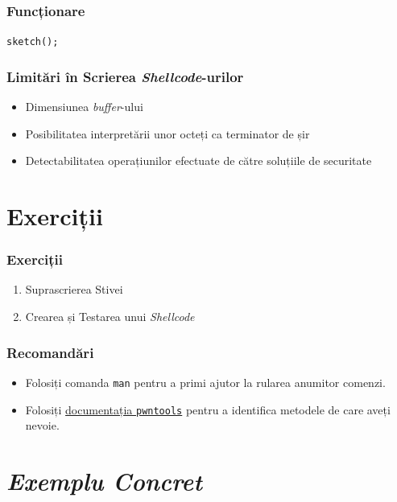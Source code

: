 \documentclass[xcolor={table}]{beamer}
\begin{document}
	\begin{frame}
		\frametitle{Funcționare}\pause
		\centering
        \texttt{sketch();}
	\end{frame}
	
	\begin{frame}
		\frametitle{Limitări în Scrierea \textit{Shellcode}-urilor}\pause
		\begin{itemize}[<+->]
			\item Dimensiunea \textit{buffer}-ului
			\item Posibilitatea interpretării unor octeți ca terminator de șir
			\item Detectabilitatea operațiunilor efectuate de către soluțiile de securitate
		\end{itemize}
	\end{frame}
	
	\section{Exerciții}
	
	\begin{frame}
		\frametitle{Exerciții}\pause
		\begin{enumerate}[<+->]
		    \item Suprascrierea Stivei
		    \item Crearea și Testarea unui \textit{Shellcode}
	    \end{enumerate}
	\end{frame}

	\begin{frame}
		\frametitle{Recomandări}\pause
		\begin{itemize}[<+->]
		    \item Folosiți comanda \texttt{man} pentru a primi ajutor la rularea anumitor comenzi.
		    \item Folosiți \href{https://docs.pwntools.com/en/stable/}{documentația \texttt{pwntools}} pentru a identifica metodele de care aveți nevoie.
	    \end{itemize}
	\end{frame}

	\section{\textit{Exemplu Concret}}
\end{document}
